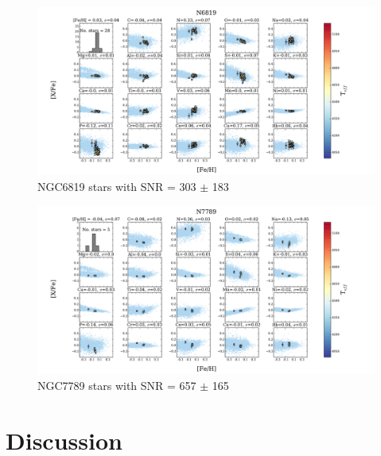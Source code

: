 \documentclass[14pt, preprint2]{aastex6}
\begin{document}
\begin{figure}
\centering
        \includegraphics[scale=0.5]{20elem-2_tc2_nofilt.pdf}
  \caption{ NGC6819 stars with SNR = 303 $\pm$ 183 }
\label{fig:c6}
\end{figure}

\begin{figure}
\centering
  \includegraphics[scale=0.5]{20elem-1_tc2_nofilt.pdf}
  \caption{ NGC7789 stars with SNR = 657 $\pm$ 165 }
\label{fig:7n}
\end{figure}



\section{Discussion}
\end{document}
